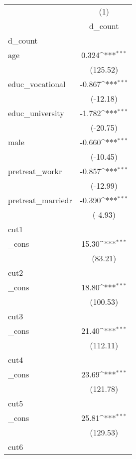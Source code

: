{
\def\sym#1{\ifmmode^{#1}\else\(^{#1}\)\fi}
\begin{tabular}{l*{1}{c}}
\hline\hline
            &\multicolumn{1}{c}{(1)}\\
            &\multicolumn{1}{c}{d\_count}\\
\hline
d\_count     &                     \\
age         &       0.324\sym{***}\\
            &    (125.52)         \\
[1em]
educ\_vocational&      -0.867\sym{***}\\
            &    (-12.18)         \\
[1em]
educ\_university&      -1.782\sym{***}\\
            &    (-20.75)         \\
[1em]
male        &      -0.660\sym{***}\\
            &    (-10.45)         \\
[1em]
pretreat\_workr&      -0.857\sym{***}\\
            &    (-12.99)         \\
[1em]
pretreat\_marriedr&      -0.390\sym{***}\\
            &     (-4.93)         \\
\hline
cut1        &                     \\
\_cons      &       15.30\sym{***}\\
            &     (83.21)         \\
\hline
cut2        &                     \\
\_cons      &       18.80\sym{***}\\
            &    (100.53)         \\
\hline
cut3        &                     \\
\_cons      &       21.40\sym{***}\\
            &    (112.11)         \\
\hline
cut4        &                     \\
\_cons      &       23.69\sym{***}\\
            &    (121.78)         \\
\hline
cut5        &                     \\
\_cons      &       25.81\sym{***}\\
            &    (129.53)         \\
\hline
cut6        &                     \\

\end{tabular}}
